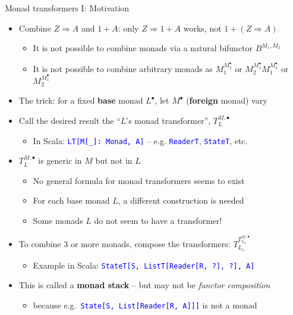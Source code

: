\documentclass[english]{beamer}
\begin{document}
\begin{frame}{Monad transformers I: Motivation}

\begin{itemize}
\item {\footnotesize{}\vspace{-0.2cm}}Combine $Z\Rightarrow A$ and $1+A$:
only $Z\Rightarrow1+A$ works, not $1+\left(Z\Rightarrow A\right)$
\begin{itemize}
\item It is not possible to combine monads via a natural bifunctor $B^{M_{1},M_{2}}$
\item It is not possible to combine arbitrary monads as $M_{1}^{M_{2}^{\bullet}}$
or $M_{2}^{M_{1}^{\bullet}}$$M_{1}^{M_{2}^{\bullet}}$
or $M_{2}^{M_{1}^{\bullet}}$
\end{itemize}
\item The trick: for a fixed \textbf{base }monad $L^{\bullet}$, let $M^{\bullet}$
(\textbf{foreign }monad) vary
\item Call the desired result the ``$L$'s monad transformer'', $T_{L}^{M,\bullet}$
\begin{itemize}
\item In Scala: \texttt{\textcolor{blue}{\footnotesize{}LT{[}M{[}\_{]}:~Monad,
A{]}}} -- e.g. \texttt{\textcolor{blue}{\footnotesize{}ReaderT}},
\texttt{\textcolor{blue}{\footnotesize{}StateT}}, etc.
\end{itemize}
\item $T_{L}^{M,\bullet}$ is generic in $M$ but not in $L$
\begin{itemize}
\item No general formula for monad transformers seems to exist
\item For each base monad $L$, a different construction is needed
\item Some monads $L$ do not seem to have a transformer!
\end{itemize}
\item To combine 3 or more monads, compose the transformers: $T_{L_{1}}^{T_{L_{2}}^{M,\bullet}}$
\begin{itemize}
\item Example in Scala: \texttt{\textcolor{blue}{\footnotesize{}StateT{[}S,
ListT{[}Reader{[}R, ?{]}, ?{]}, A{]}}} 
\end{itemize}
\item This is called a \textbf{monad stack} -- but may not be \emph{functor
composition}
\begin{itemize}
\item because e.g.~\texttt{\textcolor{blue}{\footnotesize{}State{[}S, List{[}Reader{[}R,
A{]}{]}{]}}} is not a monad
\end{itemize}
\end{itemize}
\end{frame}
\end{document}
